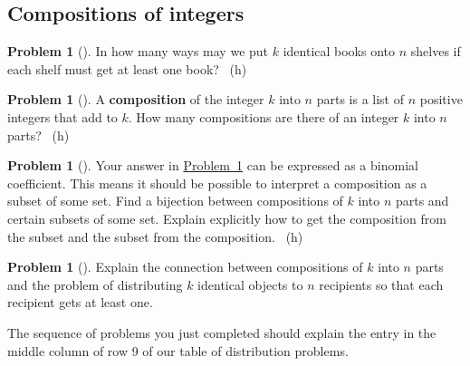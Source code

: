 \documentclass[10pt,]{book}
\newcommand{\terminology}[1]{\textbf{#1}}
\theoremstyle{plain}
\theoremstyle{definition}
\newtheorem{activity}[project]{Problem}
\theoremstyle{definition}
\numberwithin{equation}{chapter}
\newcommand{\importantarrow}{\Rightarrow}
\begin{document}
\subsection[{Compositions of integers}]{Compositions of integers}\label{subsection-31}
\begin{activity}[] \label{activity-129}
\hypertarget{p-773}{}%
In how many ways may we put \(k\) identical books onto \(n\) shelves if each shelf must get at least one book?%
~{\tiny (h)}\end{activity}
\begin{activity}[] \label{compositionagian}
\hypertarget{p-776}{}%
A \terminology{composition} of the integer \(k\) into \(n\) parts is a list of \(n\) positive integers that add to \(k\).  How many compositions are there of an integer \(k\) into \(n\) parts?%
~{\tiny (h)}\end{activity}
\begin{activity}[]\marginsymbol[-1em]{\pdftooltip{$\importantarrow$}{especially interesting}} \label{activity-131}
\hypertarget{p-779}{}%
Your answer in \hyperref[compositionagian]{Problem~\ref{compositionagian}} can be expressed as a binomial coefficient. This means it should be possible to interpret a composition as a subset of some set. Find a bijection between compositions of \(k\) into \(n\) parts and certain subsets of some set.  Explain explicitly how to get the composition from the subset and the subset from the composition.%
~{\tiny (h)}\end{activity}
\begin{activity}[] \label{activity-132}
\hypertarget{p-782}{}%
Explain the connection between compositions of \(k\) into \(n\) parts and the problem of distributing \(k\) identical objects to \(n\) recipients so that each recipient gets at least one.%
\end{activity}
\hypertarget{p-784}{}%
The sequence of problems you just completed should explain the entry in the middle column of row 9 of our table of distribution problems.%
\typeout{************************************************}
\typeout{************************************************}
\end{document}
